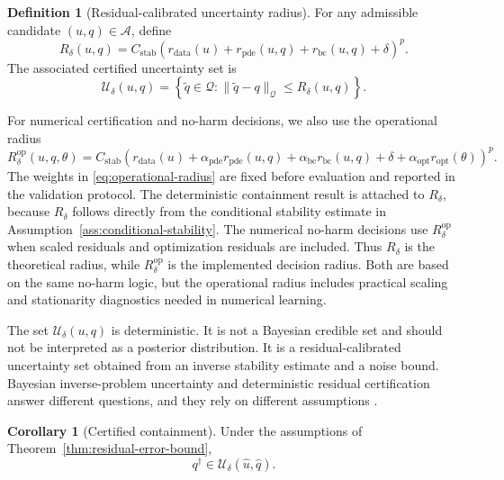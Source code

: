 \documentclass{article}
\numberwithin{equation}{section}
\theoremstyle{definition}
\newtheorem{definition}{Definition}
\newtheorem{corollary}{Corollary}
\begin{document}
\begin{definition}[Residual-calibrated uncertainty radius]
\label{def:uncertainty-radius}
For any admissible candidate \((u,q)\in\mathcal A\), define
\begin{equation}
R_\delta(u,q)
=
C_{\mathrm{stab}}
\left(
r_{\mathrm{data}}(u)
+
r_{\mathrm{pde}}(u,q)
+
r_{\mathrm{bc}}(u,q)
+
\delta
\right)^p .
\label{eq:uncertainty-radius}
\end{equation}
The associated certified uncertainty set is
\begin{equation}
\mathcal U_\delta(u,q)
=
\left\{
\widetilde q\in\mathcal Q:
\|\widetilde q-q\|_{\mathcal Q}
\le
R_\delta(u,q)
\right\}.
\label{eq:uncertainty-set}
\end{equation}
\end{definition}

For numerical certification and no-harm decisions, we also use the operational radius
\begin{equation}
R_{\delta}^{\mathrm{op}}(u,q,\theta)
=
C_{\mathrm{stab}}
\left(
r_{\mathrm{data}}(u)
+
\alpha_{\mathrm{pde}} r_{\mathrm{pde}}(u,q)
+
\alpha_{\mathrm{bc}} r_{\mathrm{bc}}(u,q)
+
\delta
+
\alpha_{\mathrm{opt}} r_{\mathrm{opt}}(\theta)
\right)^p .
\label{eq:operational-radius}
\end{equation}
The weights in \eqref{eq:operational-radius} are fixed before evaluation and reported in the validation protocol. The deterministic containment result is attached to \(R_\delta\), because \(R_\delta\) follows directly from the conditional stability estimate in Assumption~\ref{ass:conditional-stability}. The numerical no-harm decisions use \(R_{\delta}^{\mathrm{op}}\) when scaled residuals and optimization residuals are included. Thus \(R_\delta\) is the theoretical radius, while \(R_{\delta}^{\mathrm{op}}\) is the implemented decision radius. Both are based on the same no-harm logic, but the operational radius includes practical scaling and stationarity diagnostics needed in numerical learning.

The set \(\mathcal U_\delta(u,q)\) is deterministic. It is not a Bayesian credible set and should not be interpreted as a posterior distribution. It is a residual-calibrated uncertainty set obtained from an inverse stability estimate and a noise bound. Bayesian inverse-problem uncertainty and deterministic residual certification answer different questions, and they rely on different assumptions \cite{KaipioSomersalo2005,Stuart2010,Sullivan2015}.

\begin{corollary}[Certified containment]
\label{cor:certified-containment}
Under the assumptions of Theorem~\ref{thm:residual-error-bound},
\begin{equation}
q^\dagger\in\mathcal U_\delta(\widehat u,\widehat q).
\label{eq:certified-containment}
\end{equation}
\end{corollary}
\end{document}
